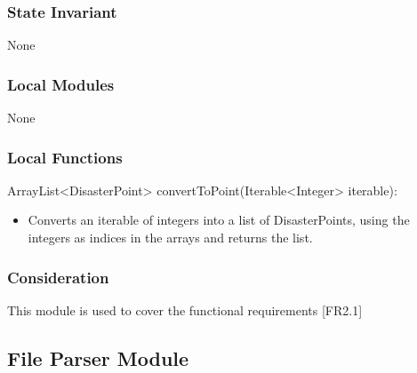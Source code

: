 \documentclass[12pt]{article}
\begin{document}
                    \subsubsection *{State Invariant}
                    
                    None
                    
                    \subsubsection* {Local Modules}
                    
                     None
                
                \subsubsection*{Local Functions}
                
                \noindent ArrayList<DisasterPoint> convertToPoint(Iterable<Integer> iterable):
			    \begin{itemize}
			        \item Converts an iterable of integers into a list of DisasterPoints, using the integers as indices in the arrays and returns the list.
			    \end{itemize}
			    
		        \subsubsection*{Consideration}
		        
                This module is used to cover the functional requirements [FR2.1]
                  
                \newpage

                   
                \newpage
                \subsection* {File Parser Module}
                
\end{document}
